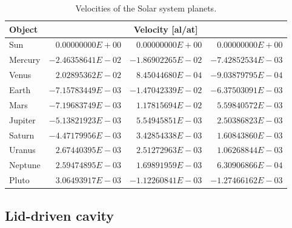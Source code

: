 \documentclass[a4paper,12pt,openany]{book}
\theoremstyle{break}
\begin{document}
\begin{table}
\begin{center}
\caption{Velocities of the Solar system planets.}\label{tbl:solarsystemvel}
\begin{tabular}{ l r r r }
\toprule[1.5pt]
\bf Object & \multicolumn{3}{c}{\bf Velocity [al/at]} \\
\midrule
Sun & $0.00000000E+00$  &  $0.00000000E+00$  &  $0.00000000E+00$ \\
Mercury & $-2.46358641E-02$  &  $-1.86902265E-02$  &  $-7.42852534E-03$ \\
Venus & $2.02895362E-02$  &  $8.45044680E-04$  &  $-9.03879795E-04$ \\
Earth & $-7.15783449E-03$  &  $-1.47042339E-02$  &  $-6.37503091E-03$ \\
Mars & $-7.19683749E-03$  &  $1.17815694E-02$  &  $5.59840572E-03$ \\
Jupiter & $-5.13821923E-03$  &  $5.54945851E-03$  &  $2.50386823E-03$ \\
Saturn & $-4.47179956E-03$  &  $3.42854338E-03$  &  $1.60843860E-03$ \\
Uranus & $2.67440395E-03$  &  $2.51272963E-03$  &  $1.06268844E-03$ \\
Neptune & $2.59474895E-03$  &  $1.69891959E-03$  &  $6.30906866E-04$ \\
Pluto & $3.06493917E-03$  &  $-1.12260841E-03$  &  $-1.27466162E-03$ \\
\bottomrule[1.25pt]
\end{tabular}
\end{center}
\end{table}

\subsection{Lid-driven cavity}
\end{document}
